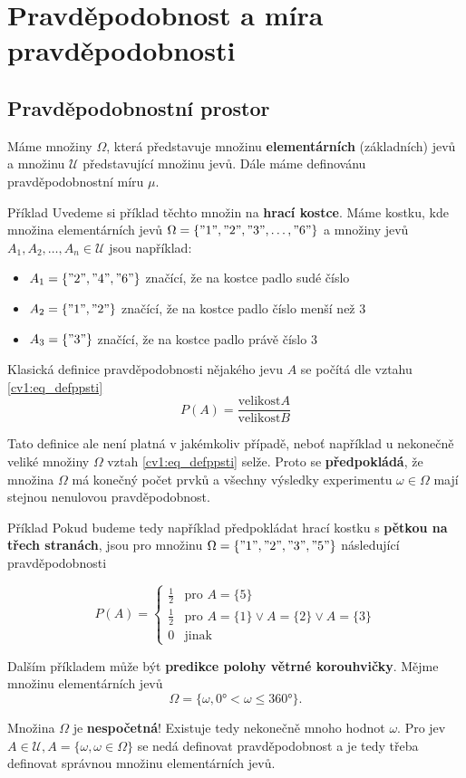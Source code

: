 \chapter{Pravděpodobnost a míra pravděpodobnosti}
\section{Pravděpodobnostní prostor}
Máme množiny $\Omega$, která představuje množinu \textbf{elementárních} (základních) jevů a množinu $\mathscr{U}$ představující množinu jevů. Dále máme definovánu pravděpodobnostní míru $\mu$.

\begin{note}{Příklad}
Uvedeme si příklad těchto množin na \textbf{hrací kostce}. Máme kostku, kde množina elementárních jevů $\Omega=\{"1","2","3",\ldots,"6"\}$ a množiny jevů $A_1,A_2, \ldots, A_n\in\mathscr{U}$ jsou například:

\begin{itemize}[noitemsep]
\item $A_1=\{"2","4","6"\}$ značící, že na kostce padlo sudé číslo
\item $A_2=\{"1","2"\}$ značící, že na kostce padlo číslo menší než $3$
\item $A_3=\{"3"\}$ značící, že na kostce padlo právě číslo $3$
\end{itemize}
\end{note}

Klasická definice pravděpodobnosti nějakého jevu $A$ se počítá dle vztahu \ref{cv1:eq_defppsti}
\begin{equation}
P(A) = \frac{\text{velikost} A}{\text{velikost} B}\label{cv1:eq_defppsti}
\end{equation}

Tato definice ale není platná v jakémkoliv případě, neboť například u nekonečně veliké množiny $\Omega$ vztah \ref{cv1:eq_defppsti} selže. Proto se \textbf{předpokládá}, že množina $\Omega$ má konečný počet prvků a všechny výsledky experimentu $\omega\in\Omega$ mají stejnou nenulovou pravděpodobnost.

\begin{note}{Příklad}
Pokud budeme tedy například předpokládat hrací kostku s \textbf{pětkou na třech stranách}, jsou pro množinu $\Omega=\{"1","2","3","5"\}$ následující pravděpodobnosti

\[
P(A)=
\begin{cases}
\frac{1}{2} & \text{pro } A=\{5\}\\
\frac{1}{2} & \text{pro } A=\{1\}\vee A=\{2\}\vee A=\{3\}\\
0 & \text{jinak}
\end{cases}
\]

Dalším příkladem může být \textbf{predikce polohy větrné korouhvičky}. Mějme množinu elementárních jevů
\[ \Omega=\{\omega, 0 \si{\degree} <\omega\leq 360 \si{\degree} \}. \]

Množina $\Omega$ je \textbf{nespočetná}! Existuje tedy nekonečně mnoho hodnot $\omega$. Pro jev $A\in\mathscr{U},A=\{\omega,\omega\in\Omega\}$ se nedá definovat pravděpodobnost a je tedy třeba definovat správnou množinu elementárních jevů.
\end{note}

